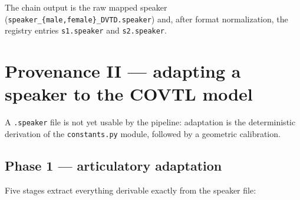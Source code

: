 \documentclass[11pt,a4paper]{article}
\newcommand{\speakerfile}[1]{\texttt{#1.speaker}}
\newcommand{\code}[1]{\texttt{#1}}
\begin{document}
The chain output is the raw mapped speaker
(\code{speaker\_\{male,female\}\_DVTD.speaker}) and, after format
normalization, the registry entries \code{s1.speaker} and
\code{s2.speaker}.

\section{Provenance II --- adapting a speaker to the COVTL model}\label{sec:adapt}

A \speakerfile{} file is not yet usable by the pipeline: adaptation
is the deterministic derivation of the \code{constants.py} module,
followed by a geometric calibration.

\subsection{Phase 1 --- articulatory adaptation}

Five stages extract everything derivable exactly from the speaker
file:
\end{document}
